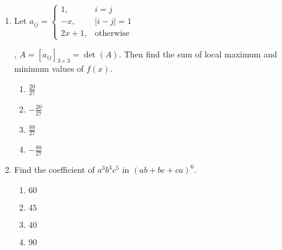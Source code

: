 \documentclass[journal]{IEEEtran}
\newcommand{\brak}[1]{\left( #1 \right)}
\newcommand{\sbrak}[1]{\left[ #1 \right]}
\newcommand{\abs}[1]{\left| #1 \right|}
\newcommand{\gt}{>}
\begin{document}
\begin{enumerate}
        , $\lambda \in \mathbb{R}$, $\alpha \gt 0$ and
        
        $\mathbf{r_2} = -4 \hat{i} - \hat{k} + \mu \brak{3 \hat{i} - 2 \hat{j} - 2 \hat{k}}$
        
        , $\mu \in \mathbb{R}$ is 9, then the value of $\alpha$ is:
        
        \begin{multicols}{4}
        \begin{enumerate}
        \item $2$
        \item $4$
        \item $6$
        \item $\sqrt{6}$
        \end{enumerate}
        \end{multicols}
        
        
    \item Let $a_{ij} = \begin{cases}
        1, & i = j \\
        -x, & \abs{i - j} = 1 \\
        2x + 1, & \text{otherwise}
        \end{cases}$
        
        , $A = \sbrak{a_{ij}}_{3 \times 3} = \det\brak{A}$. Then find the sum of local maximum and minimum values of $f\brak{x}$.
        
        \begin{multicols}{4}
        \begin{enumerate}
        \item $\frac{20}{27}$
        \item $-\frac{20}{27}$
        \item $\frac{88}{27}$
        \item $-\frac{88}{27}$
        \end{enumerate}
        \end{multicols}

    \item Find the coefficient of $a^3b^4c^5$ in $\brak{ab + bc + ca}^6$.
        
        \begin{multicols}{4}
        \begin{enumerate}
        \item $60$
        \item $45$
        \item $40$
        \item $90$
        \end{enumerate}
        \end{multicols}
        

\end{enumerate}
\end{document}
